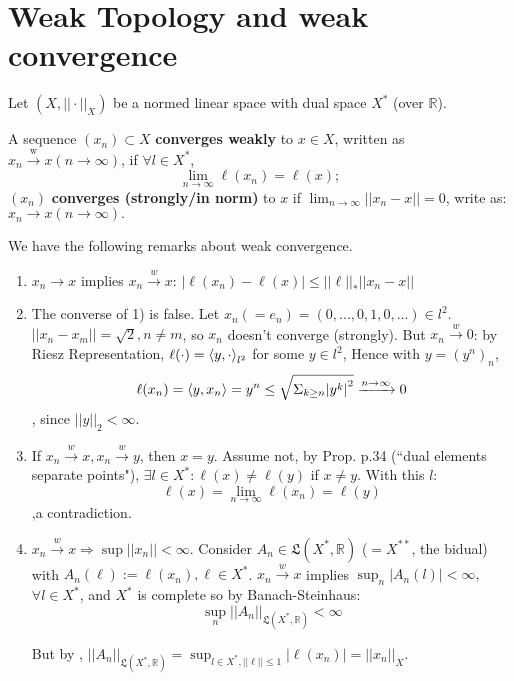 \documentclass{article}
\begin{document}
  
\section{Weak Topology and weak convergence}
Let $(X, || \cdot ||_X)$ be a normed linear space with dual space $X^*$ (over $\mathbb{R}$).

\begin{definition}\nl
A sequence $(x_n) \subset X$ \textbf{converges weakly} to $x\in X$, written as $x_n \xrightarrow{\text{w}} x (n \rightarrow \infty)$, if $\forall l \in X^*$, 
    $$\lim_{n\rightarrow \infty} \ell(x_n) = \ell(x);$$
$(x_n)$ \textbf{converges (strongly/in norm)} to $x$ if $\lim_{n\rightarrow \infty} ||x_n - x|| = 0$, write as: $x_n \rightarrow x (n\rightarrow \infty).$
\end{definition}

\begin{remark}
\label{properties of weak convergence}
We have the following remarks about weak convergence.  

\begin{enumerate}[1)]
    \item $x_n\rightarrow x$ implies  $x_n \xrightarrow{w} x$: $|\ell(x_n) - \ell(x)| \leq ||\ell||_* ||x_n - x||$
    
    \item The converse of 1) is false. Let $x_n (= e_n) = (0,...,0,1,0,...) \in l^2$. $||x_n-x_m|| = \sqrt{2}, n\neq m$, so $x_n$ doesn't converge (strongly). But $x_n \xrightarrow{w} 0$: by Riesz Representation, $\ell(\cdot) = \left<{y},{\cdot}\right>_{l^2}$ for some $y \in l^2$, Hence with $y=(y^n)_n$, $$\ell(x_n) = \left<{y},{x_n}\right> = y^n \leq \sqrt{\Sigma_{k\geq n} {|y^k|}^2} \xrightarrow{n\rightarrow \infty} 0$$, since $||y||_2 < \infty$.
    
    \item If $x_n \xrightarrow{w} x, x_n \xrightarrow{w} y$, then $x=y$. Assume not, by Prop. p.34 (\textquotedblleft dual elements separate points"), $\exists l \in X^*: \ell(x) \neq \ell(y)$ if $x\neq y$. With this $l$: $$\ell(x) = \lim_{n \to \infty} \ell(x_n) = \ell(y) $$ 
    ,a contradiction.
    
    \item $x_n \xrightarrow{w} x \Rightarrow \sup||x_n|| < \infty$. Consider $A_n \in \mathfrak{L}(X^*, \mathbb{R})$ ($=X^{**}$, the bidual) with $A_n(\ell) := \ell(x_n), \ell \in X^*$. $x_n \xrightarrow{w} x$ implies $\sup_n |A_n(l)| < \infty,$ $\forall l\in X^*$, and $X^*$ is complete so by Banach-Steinhaus: $$\sup_n ||A_n||_{\mathfrak{L}(X^*, \mathbb{R})} < \infty$$ 
    
    But by ,  $||A_n||_{\mathfrak{L}(X^*,\mathbb{R})} = \sup_{l\in X^*, ||\ell||\leq 1} |\ell(x_n)| = ||x_n||_X$.
\end{enumerate}
\end{remark}
\end{document}
